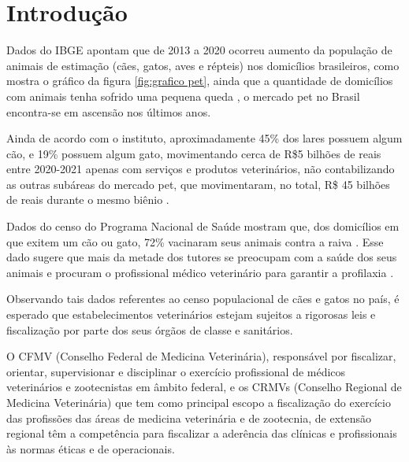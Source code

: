 \documentclass[
    12pt,               %
    openright,          %
    oneside,
    a4paper,            %
    MODELO,             %
    TODO,               %
    english,            %
    brazil              %
    ]{ifsp-spo-inf-ctds}
\begin{document}
\frenchspacing 

\pretextual

\imprimirfolhaderosto

\textual

\chapter[Introdução]{Introdução}
    
    Dados do IBGE apontam que de 2013 a 2020 ocorreu aumento da população de animais de estimação (cães, gatos, aves e répteis) nos domicílios brasileiros, como mostra o gráfico da figura \ref{fig:grafico pet}, ainda que a quantidade de domicílios com animais tenha sofrido uma pequena queda \cite{ibge2013} \cite{pet2021}, o mercado pet no Brasil encontra-se em ascensão nos últimos anos.
    
    Ainda de acordo com o instituto, aproximadamente 45\% dos lares possuem algum cão, e 19\% possuem algum gato,\cite{cao2019,} \cite{gato2019} movimentando cerca de R\$5 bilhões de reais entre 2020-2021 apenas com serviços e produtos veterinários, não contabilizando as outras subáreas do mercado pet, que movimentaram, no total, R\$ 45 bilhões de reais durante o mesmo biênio \cite{pet2021}.
    
    Dados do censo do Programa Nacional de Saúde mostram que, dos domicílios em que exitem um cão ou gato, 72\% vacinaram seus animais contra a raiva \cite{vacina2019}. Esse dado sugere que mais da metade dos tutores se preocupam com a saúde dos seus animais e procuram o profissional médico veterinário para garantir a profilaxia \cite{vacina2019}.
     
    Observando tais dados referentes ao censo populacional de cães e gatos no país, é esperado que estabelecimentos veterinários estejam sujeitos a rigorosas leis e fiscalização por parte dos seus órgãos de classe e sanitários.
    
    O CFMV (Conselho Federal de Medicina Veterinária), responsável por fiscalizar, orientar, supervisionar e disciplinar o exercício profissional de médicos veterinários e zootecnistas em âmbito federal, e os CRMVs (Conselho Regional de Medicina Veterinária) que tem como principal escopo a fiscalização do exercício das profissões das áreas de medicina veterinária e de zootecnia, de extensão regional\cite{doc_obrig} têm a competência para fiscalizar a aderência das clínicas e profissionais às normas éticas e de  operacionais.
     
\end{document}
